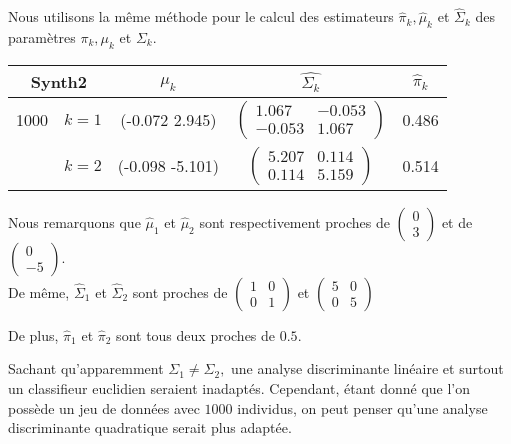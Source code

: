 \documentclass{article}
\begin{document}
\begin{multicols}{2}
Nous utilisons la même méthode pour le calcul des estimateurs $\widehat{\pi}_k, \widehat{\mu}_k$ et $\widehat{\Sigma}_k$ des paramètres $\pi_k, \mu_k$ et $\Sigma_k$.

\begin{center}
{\footnotesize
\begin{tabular}{|@{}c@{}|c||@{}c@{}|@{}c@{}|c|}
\hline
\multicolumn{2}{|c|}{Synth2} & $\widehat{\mu}_k$ & $\widehat{\Sigma_k}$ & $ \widehat{\pi}_k$  \\
\hline
\hline
1000 & $ k=1 $ & (-0.072 2.945) & $\begin{pmatrix}
  1.067 & -0.053 \\
  -0.053 & 1.067 
\end{pmatrix}$
  & 0.486 \\
\cline{2-3}
 & $ k=2 $  & (-0.098 -5.101) & $\begin{pmatrix}
  5.207 & 0.114 \\
  0.114 & 5.159 
\end{pmatrix}$ & 0.514 \\
\hline
\end{tabular}
}
\end{center}

Nous remarquons que $\widehat{\mu}_1$ et $\widehat{\mu}_2$ sont respectivement proches de  $\begin{pmatrix} 0 \\ 3 \end{pmatrix}$ et de $\begin{pmatrix} 0 \\ -5 \end{pmatrix}$. \\
De même, $\widehat{\Sigma}_1$ et $\widehat{\Sigma}_2$ sont proches de 
$\begin{pmatrix}
  1 & 0 \\
  0 & 1  
\end{pmatrix}$ et $\begin{pmatrix}
  5 & 0 \\
  0 & 5  
\end{pmatrix}$ 

De plus, $\widehat{\pi}_1$ et $\widehat{\pi}_2$ sont tous deux proches de  $0.5$.

Sachant qu'apparemment $\Sigma_1 \neq \Sigma_2,$ une analyse discriminante linéaire et surtout un classifieur euclidien seraient inadaptés. Cependant, étant donné que l'on possède un jeu de données avec $1000$ individus, on peut penser qu'une analyse discriminante quadratique serait plus adaptée.  


\end{multicols}
\end{document}
